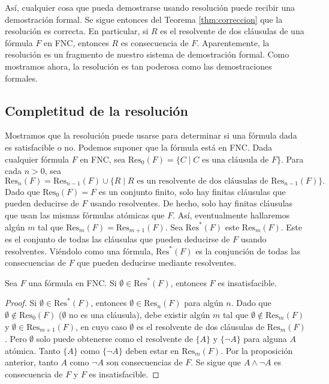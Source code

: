 \message{ !name(main.tex)}\documentclass[12pt,a4paper]{book}
\begin{document}
    Así, cualquier cosa que pueda demostrarse usando resolución puede recibir una demostración formal. Se sigue entonces del
    Teorema \ref{thm:correccion} que la resolución es correcta. En particular, si $R$ es el resolvente de dos cláusulas de
    una fórmula $F$ en FNC, entonces $R$ es consecuencia de $F$. Aparentemente, la resolución es un fragmento de nuestro
    sistema de demostración formal. Como mostramos ahora, la resolución es tan poderosa como las demostraciones formales.

    \subsection{Completitud de la resolución}

    Mostramos que la resolución puede usarse para determinar si una fórmula dada es satisfacible o no. Podemos suponer que
    la fórmula está en FNC. Dada cualquier fórmula $F$ en FNC, sea $\mathrm{Res}_{0}(F)=\{C\mid C\text{ es una cláusula de }F\}$.
    Para cada $n>0$, sea
    \begin{equation*}
        \mathrm{Res}_{n}(F)=\mathrm{Res}_{n-1}(F)\cup\{R\mid R\text{ es un resolvente de dos cláusulas de }\mathrm{Res}_{n-1}(F)\}.
    \end{equation*}
    Dado que $\mathrm{Res}_{0}(F)=F$ es un conjunto finito, solo hay finitas cláusulas que pueden deducirse de $F$ usando
    resolventes. De hecho, solo hay finitas cláusulas que usan las mismas fórmulas atómicas que $F$. Así, eventualmente
    hallaremos algún $m$ tal que $\mathrm{Res}_{m}(F)=\mathrm{Res}_{m+1}(F)$. Sea $\mathrm{Res}^{*}(F)$ este $\mathrm{Res}_{m}(F)$.
    Este es el conjunto de todas las cláusulas que pueden deducirse de $F$ usando resolventes. Viéndolo como una fórmula,
    $\mathrm{Res}^{*}(F)$ es la conjunción de todas las consecuencias de $F$ que pueden deducirse mediante resolventes.

    \begin{proposicion}\label{prop:vacio-implica-insatisfacible}
        Sea $F$ una fórmula en FNC. Si $\emptyset\in\mathrm{Res}^{*}(F)$, entonces $F$ es insatisfacible.
    \end{proposicion}
    \begin{proof}
        Si $\emptyset\in\mathrm{Res}^{*}(F)$, entonces $\emptyset\in\mathrm{Res}_{n}(F)$ para algún $n$. Dado que
        $\emptyset\notin\mathrm{Res}_{0}(F)$ ($\emptyset$ no es una cláusula), debe existir algún $m$ tal que
        $\emptyset\notin\mathrm{Res}_{m}(F)$ y $\emptyset\in\mathrm{Res}_{m+1}(F)$, en cuyo caso $\emptyset$ es el resolvente
        de dos cláusulas de $\mathrm{Res}_{m}(F)$. Pero $\emptyset$ solo puede obtenerse como el resolvente de $\{A\}$ y
        $\{\neg A\}$ para alguna $A$ atómica. Tanto $\{A\}$ como $\{\neg A\}$ deben estar en $\mathrm{Res}_{m}(F)$. Por la
        proposición anterior, tanto $A$ como $\neg A$ son consecuencias de $F$. Se sigue que $A\wedge\neg A$ es consecuencia
        de $F$ y $F$ es insatisfacible.
    \end{proof}
\end{document}
